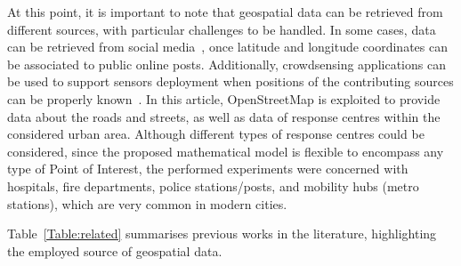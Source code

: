 \begin{refsection}
At this point, it is important to note that geospatial data can be retrieved from different sources, with particular challenges to be handled. In some cases, data can be retrieved from social media~\cite{twitterGeospatialSensors}, once latitude and longitude coordinates can be associated to public online posts. Additionally, crowdsensing applications can be used to support sensors deployment when positions of the contributing sources can be properly known~\cite{positioning5}. In this article, OpenStreetMap is exploited to provide data about the roads and streets, as well as data of response centres within the considered urban area. Although different types of response centres could be considered, since the proposed mathematical model is flexible to encompass any type of Point of Interest, the performed experiments were concerned with hospitals, fire departments, police stations/posts, and mobility hubs (metro stations), which are very common in modern cities. 

Table~\ref{Table:related} summarises previous works in the literature, highlighting the employed source of geospatial data. 

\begin{table}
  \centering
  \caption{Some works exploiting geospatial data to support sensors positioning and deployment.}
  \label{Table:related}
\end{table}


\end{refsection}
